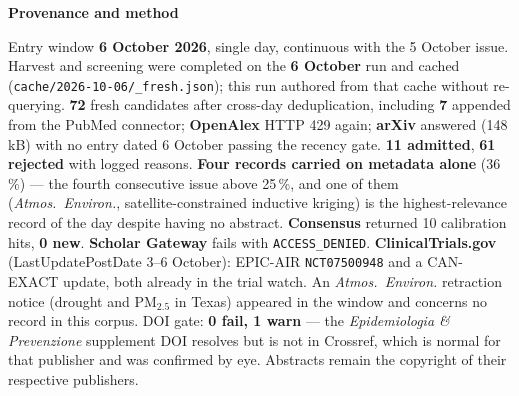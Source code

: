 \documentclass[10pt]{article}
\begin{document}
\begin{keybox}
{\sffamily\bfseries\footnotesize\color{Deep}Provenance and method}\\[1.2mm]
{\fontsize{7.2}{8.8}\selectfont
Entry window \textbf{6 October 2026}, single day, continuous with the 5 October issue. Harvest
and screening were completed on the \textbf{6 October} run and cached
(\texttt{cache/2026-10-06/\_fresh.json}); this run authored from that cache without re-querying.
\textbf{72} fresh candidates after cross-day deduplication, including \textbf{7} appended from the PubMed
connector; \textbf{OpenAlex} HTTP 429 again; \textbf{arXiv} answered (148\,kB) with no entry dated
6 October passing the recency gate. \textbf{11 admitted}, \textbf{61 rejected} with logged reasons.
\textbf{Four records carried on metadata alone} (36\,\%) --- the fourth consecutive issue above 25\,\%,
and one of them (\textit{Atmos.\ Environ.}, satellite-constrained inductive kriging) is the
highest-relevance record of the day despite having no abstract. \textbf{Consensus} returned 10 calibration
hits, \textbf{0 new}. \textbf{Scholar Gateway} fails with \texttt{ACCESS\_DENIED}.
\textbf{ClinicalTrials.gov} (LastUpdatePostDate 3--6 October): EPIC-AIR \texttt{NCT07500948} and a
CAN-EXACT update, both already in the trial watch. An \textit{Atmos.\ Environ.} retraction notice
(drought and PM$_{2.5}$ in Texas) appeared in the window and concerns no record in this corpus. DOI gate:
\textbf{0 fail, 1 warn} --- the \textit{Epidemiologia \& Prevenzione} supplement DOI resolves but is not in
Crossref, which is normal for that publisher and was confirmed by eye. Abstracts remain the copyright of
their respective publishers.\par}
\end{keybox}
\end{document}
